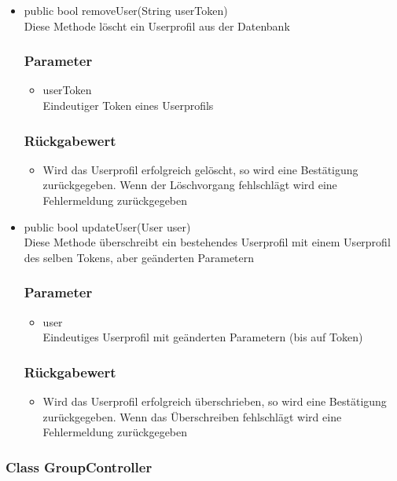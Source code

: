 \documentclass[a4paper]{scrreprt}
\begin{document}
\begin{addmargin}[25pt]{0pt}
\begin{itemize}
\item public bool removeUser(String userToken)\\
	Diese Methode löscht ein Userprofil aus der Datenbank
	\subsubsection*{Parameter}
	\begin{itemize}
	\item userToken \\
		Eindeutiger Token eines Userprofils
	\end{itemize}
	\subsubsection*{Rückgabewert}
	\begin{itemize}
	\item Wird das Userprofil erfolgreich gelöscht, so wird eine Bestätigung zurückgegeben. Wenn der Löschvorgang fehlschlägt wird eine Fehlermeldung zurückgegeben
	\end{itemize}


\item public bool updateUser(User user)\\
	Diese Methode überschreibt ein bestehendes Userprofil mit einem Userprofil des selben Tokens, aber geänderten Parametern
	\subsubsection*{Parameter}
	\begin{itemize}
	\item user \\
		Eindeutiges Userprofil mit geänderten Parametern (bis auf Token)
	\end{itemize}
	\subsubsection*{Rückgabewert}
	\begin{itemize}
	\item Wird das Userprofil erfolgreich überschrieben, so wird eine Bestätigung zurückgegeben. Wenn das Überschreiben fehlschlägt wird eine Fehlermeldung zurückgegeben
	\end{itemize}
\end{itemize}

\end{addmargin}

\subsubsection{Class GroupController}
\end{document}
